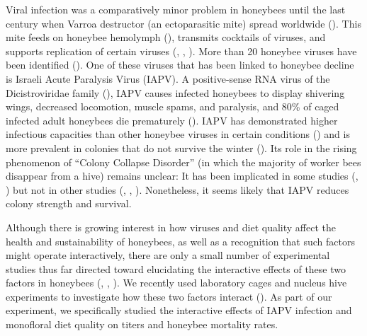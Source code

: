 \documentclass[11pt,a4paper,oldfontcommands,openany]{memoir}
\numberwithin{equation}{section} %
\begin{document}
Viral infection was a comparatively minor problem in honeybees until the last century when Varroa destructor (an ectoparasitic mite) spread worldwide (\citealt{miteSpread}). This mite feeds on honeybee hemolymph (\citealt{hemolymph}), transmits cocktails of viruses, and supports replication of certain viruses (\citealt{miteVirus}, \citealt{miteVirus2}, \citealt{miteVirus3}). More than 20 honeybee viruses have been identified (\citealt{numVirus}). One of these viruses that has been linked to honeybee decline is Israeli Acute Paralysis Virus (IAPV). A positive-sense RNA virus of the Dicistroviridae family (\citealt{fam}), IAPV causes infected honeybees to display shivering wings, decreased locomotion, muscle spams, and paralysis, and 80\% of caged infected adult honeybees die prematurely (\citealt{symptoms}). IAPV has demonstrated higher infectious capacities than other honeybee viruses in certain conditions (\citealt{carrillo}) and is more prevalent in colonies that do not survive the winter (\citealt{winter}). Its role in the rising phenomenon of ``Colony Collapse Disorder'' (in which the majority of worker bees disappear from a hive) remains unclear: It has been implicated in some studies (\citealt{iapvCCD}, \citealt{iapvCCD2}) but not in other studies (\citealt{ccd1}, \citealt{iapvCCD3}, \citealt{fam}). Nonetheless, it seems likely that IAPV reduces colony strength and survival.

Although there is growing interest in how viruses and diet quality affect the health and sustainability of honeybees, as well as a recognition that such factors might operate interactively, there are only a small number of experimental studies thus far directed toward elucidating the interactive effects of these two factors in honeybees (\citealt{intNV}, \citealt{intNV2}, \citealt{intNV3}). We recently used laboratory cages and nucleus hive experiments to investigate how these two factors interact (\citealt{adamInt}). As part of our experiment, we specifically studied the interactive effects of IAPV infection and monofloral diet quality on titers and honeybee mortality rates. 
\end{document}

